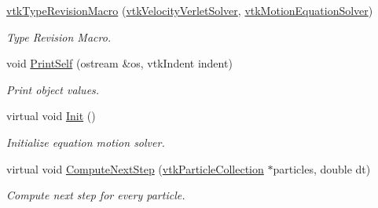 \begin{DoxyCompactItemize}
\item 
\hypertarget{classvtkVelocityVerletSolver_ac75094e4050d163be635f823e7abd596}{
\hyperlink{classvtkVelocityVerletSolver_ac75094e4050d163be635f823e7abd596}{vtkTypeRevisionMacro} (\hyperlink{classvtkVelocityVerletSolver}{vtkVelocityVerletSolver}, \hyperlink{classvtkMotionEquationSolver}{vtkMotionEquationSolver})}
\label{classvtkVelocityVerletSolver_ac75094e4050d163be635f823e7abd596}

\begin{DoxyCompactList}\small\item\em Type Revision Macro. \item\end{DoxyCompactList}\item 
\hypertarget{classvtkVelocityVerletSolver_aaea94587e955e0df7ba0fcc705883f04}{
void \hyperlink{classvtkVelocityVerletSolver_aaea94587e955e0df7ba0fcc705883f04}{PrintSelf} (ostream \&os, vtkIndent indent)}
\label{classvtkVelocityVerletSolver_aaea94587e955e0df7ba0fcc705883f04}

\begin{DoxyCompactList}\small\item\em Print object values. \item\end{DoxyCompactList}\item 
\hypertarget{classvtkVelocityVerletSolver_aceb81c517b082ed4b67aaf495d043553}{
virtual void \hyperlink{classvtkVelocityVerletSolver_aceb81c517b082ed4b67aaf495d043553}{Init} ()}
\label{classvtkVelocityVerletSolver_aceb81c517b082ed4b67aaf495d043553}

\begin{DoxyCompactList}\small\item\em Initialize equation motion solver. \item\end{DoxyCompactList}\item 
virtual void \hyperlink{classvtkVelocityVerletSolver_af9c28e67adeab24a3d24e73daa2e40dd}{ComputeNextStep} (\hyperlink{classvtkParticleCollection}{vtkParticleCollection} $\ast$particles, double dt)
\begin{DoxyCompactList}\small\item\em Compute next step for every particle. \item\end{DoxyCompactList}\end{DoxyCompactItemize}

